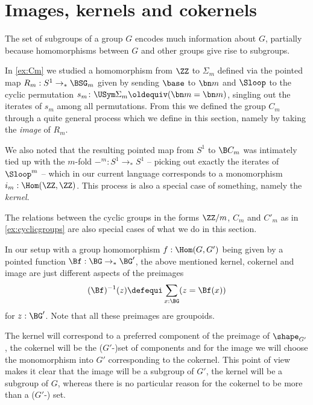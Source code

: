 \section{Images, kernels and cokernels}
\label{subsec:ker}

The set of subgroups of a group $G$ encodes much information about $G$, partially because homomorphisms between $G$ and other groups give rise to subgroups.

In \cref{ex:Cm} we studied a homomorphism from $\ZZ$ to $\Sigma_m$ defined via the pointed map $R_m:S^1\to_*\BSG_m$ given by sending $\base$ to $\bn m$ and
$\Sloop$ to the cyclic permutation $s_m\colon\USym\Sigma_m\oldequiv(\bn m=\bn m)$, singling out the iterates of $s_m$ among all permutations.  From this we defined the group $C_m$ through a quite general process which we define in this section, namely by taking the \emph{image} of $R_m$.

We also noted that the resulting pointed map from $S^1$ to $\B C_m$ was intimately tied up with the $m$-fold \covering $-^m:S^1\to_*S^1$ -- picking out exactly the iterates of $\Sloop^m$ -- which in our current language corresponds to a monomorphism $i_m:\Hom(\ZZ,\ZZ)$. This process is also a special case of something, namely the \emph{kernel}.

The relations between the cyclic groups in the forms $\ZZ/m$, $C_m$ and $C'_m$ as in \cref{ex:cyclicgroups} are also special cases of  what we do in this section.




In our setup with a group homomorphism
$f:\Hom(G,G')$ being given by a pointed function $\Bf:\BG\to_*\BG'$, the above mentioned kernel, cokernel and image are just different aspects of the preimages
$$(\Bf)^{-1}(z)\defequi\sum_{x:\BG}(z=\Bf(x))$$
for $z:\BG'$.  Note that all these preimages are groupoids.

The kernel will correspond to a preferred component of the preimage of $\shape_{G'}$, the cokernel will be the ($G'$-)set of components and for the image we will choose the monomorphism into $G'$ corresponding to the cokernel.  This point of view makes it clear that the image will be a subgroup of $G'$, the kernel will be a subgroup of $G$, whereas there is no particular reason for the cokernel to be more than a ($G'$-) set.

